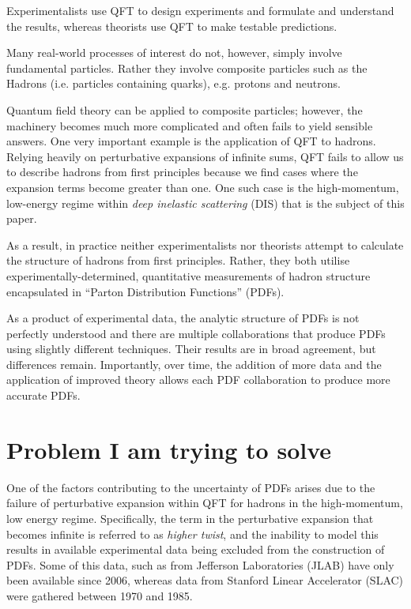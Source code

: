 \documentclass[12pt,a4paper]{report}
\begin{document}
Experimentalists use QFT to design experiments and formulate and understand the results, whereas theorists use QFT to make testable predictions.

Many real-world processes of interest do not, however, simply involve fundamental particles. Rather they involve composite particles such as the Hadrons (i.e. particles containing quarks), e.g. protons and neutrons.

Quantum field theory can be applied to composite particles; however, the machinery becomes much more complicated and often fails to yield sensible answers. One very important example is the application of QFT to hadrons. Relying heavily on perturbative expansions of infinite sums, QFT fails to allow us to describe hadrons from first principles because we find cases where the expansion terms become greater than one. One such case is the high-momentum, low-energy regime within \emph{deep inelastic scattering} (DIS) that is the subject of this paper.

As a result, in practice neither experimentalists nor theorists attempt to calculate the structure of hadrons from first principles. Rather, they both utilise experimentally-determined, quantitative measurements of hadron structure encapsulated in ``Parton Distribution Functions'' (PDFs).

As a product of experimental data, the analytic structure of PDFs is not perfectly understood and there are multiple collaborations that produce PDFs using slightly different techniques. Their results are in broad agreement, but differences remain. Importantly, over time, the addition of more data and the application of improved theory allows each PDF collaboration to produce more accurate PDFs.

\section{Problem I am trying to solve}

One of the factors contributing to the uncertainty of PDFs arises due to the failure of perturbative expansion within QFT for hadrons in the high-momentum, low energy regime. Specifically, the term in the perturbative expansion that becomes infinite is referred to as \emph{higher twist}, and the inability to model this results in available experimental data being excluded from the construction of PDFs. Some of this data, such as from Jefferson Laboratories (JLAB) \cite{JLAB} have only been available since 2006, whereas data from Stanford Linear Accelerator (SLAC) \cite{Whitlow} were gathered between 1970 and 1985.
\end{document}
